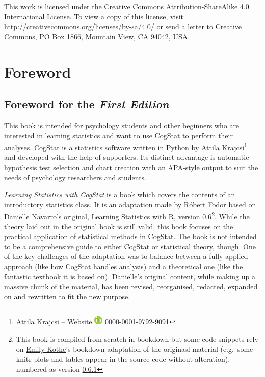 \documentclass[
  11pt,
]{book}
\theoremstyle{definition}
\theoremstyle{definition}
\theoremstyle{definition}
\theoremstyle{definition}
\theoremstyle{remark}
\begin{document}
This work is licensed under the Creative Commons Attribution-ShareAlike 4.0 International License. To view a copy of this license, visit \url{http://creativecommons.org/licenses/by-sa/4.0/} or send a letter to Creative Commons, PO Box 1866, Mountain View, CA 94042, USA.

\hypertarget{foreword}{%
\chapter*{Foreword}\label{foreword}}

\hypertarget{foreword-for-the-first-edition}{%
\section*{\texorpdfstring{Foreword for the \emph{First Edition}}{Foreword for the First Edition}}\label{foreword-for-the-first-edition}}

This book is intended for psychology students and other beginners who are interested in learning statistics and want to use CogStat to perform their analyses. \href{https://www.cogstat.org}{CogStat} is a statistics software written in Python by Attila Krajcsi\footnote{Attila Krajcsi -- \href{http://www.attilakrajcsi.hu}{Website} \textbar{} \href{https://orcid.org/0000-0001-9792-9091}{\includegraphics{resources/image/orcid_16x16.png}} 0000-0001-9792-9091} and developed with the help of supporters. Its distinct advantage is automatic hypothesis test selection and chart creation with an APA-style output to suit the needs of psychology researchers and students.

\emph{Learning Statistics with CogStat} is a book which covers the contents of an introductory statistics class. It is an adaptation made by Róbert Fodor based on Danielle Navarro's original, \href{https://learningstatisticswithr.com}{Learning Statistics with R}, version 0.6\footnote{This book is compiled from scratch in bookdown but some code snippets rely on \href{https://twitter.com/emilyandthelime}{Emily Kothe}'s bookdown adaptation of the originasl material (e.g.~some knitr plots and tables appear in the source code without alteration), numbered as version \href{https://learningstatisticswithr.com/book/}{0.6.1}}. While the theory laid out in the original book is still valid, this book focuses on the practical application of statistical methods in CogStat. The book is not intended to be a comprehensive guide to either CogStat or statistical theory, though. One of the key challenges of the adaptation was to balance between a fully applied approach (like how CogStat handles analysis) and a theoretical one (like the fantastic textbook it is based on). Danielle's original content, while making up a massive chunk of the material, has been revised, reorganised, redacted, expanded on and rewritten to fit the new purpose.
\end{document}
